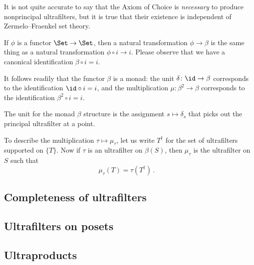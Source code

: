 \begin{nul}
	It is not quite accurate to say that the Axiom of Choice is \emph{necessary} to produce nonprincipal ultrafilters, but it is true that their existence is independent of Zermelo--Fraenkel set theory.
\end{nul}

\begin{nul}
	If $ \phi $ is a functor $ \Set \to \Set $, then a natural transformation $ \phi \to \beta $ is the same thing as a natural transformation $ \phi \circ i \to i $.
	Please observe that we have a canonical identification $ \beta \circ i = i $.

	It follows readily that the functor $ \beta $ is a monad: the unit $ \delta \colon \id \to \beta $ corresponds to the identification $ {\id} \circ i = i $, and the multiplication $ \mu \colon \beta^2 \to \beta $ corresponds to the identification $ \beta^2 \circ i = i $.

	The unit for the monad $\beta$ structure is the assignment $ s \mapsto \delta_s $ that picks out the principal ultrafilter at a point.

	To describe the multiplication $ \tau \mapsto \mu_{\tau} $, let us write $ T^{\dag} $ for the set of ultrafilters supported on $\{T\}$.
	Now if $ \tau $ is an ultrafilter on $ \beta(S) $, then $ \mu_{\tau} $ is the ultrafilter on $S$ such that
	\[
		\mu_{\tau} ( T ) = \tau ( T^{\dag} ) \period
	\]
\end{nul}

\subsection{Completeness of ultrafilters}%
\label{sub:completeness_of_ultrafilters}

\subsection{Ultrafilters on posets}%
\label{sub:ultrafilters_on_posets}

\subsection{Ultraproducts}%
\label{sub:ultraproducts}




